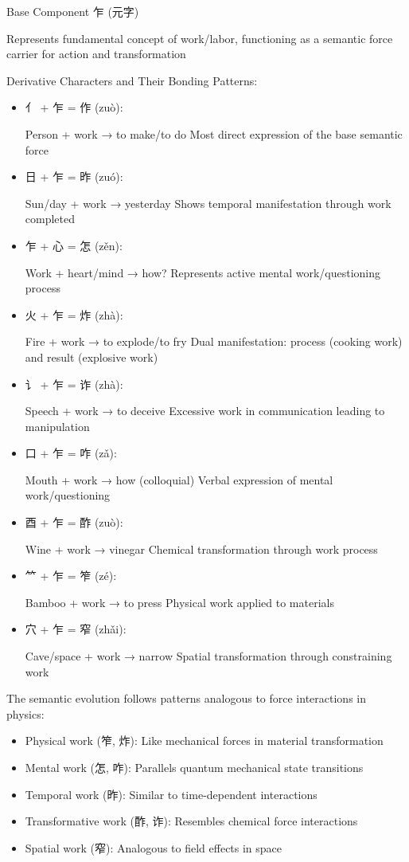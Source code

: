 \documentclass[
]{article}
\begin{document}
Base Component 乍 (元字)

Represents fundamental concept of work/labor, functioning as a semantic
force carrier for action and transformation

Derivative Characters and Their Bonding Patterns:

\begin{itemize}
\item
  亻 + 乍 = 作 (zuò):

  Person + work → to make/to do Most direct expression of the base
  semantic force
\item
  日 + 乍 = 昨 (zuó):

  Sun/day + work → yesterday Shows temporal manifestation through work
  completed
\item
  乍 + 心 = 怎 (zěn):

  Work + heart/mind → how? Represents active mental work/questioning
  process
\item
  火 + 乍 = 炸 (zhà):

  Fire + work → to explode/to fry Dual manifestation: process (cooking
  work) and result (explosive work)
\item
  讠 + 乍 = 诈 (zhà):

  Speech + work → to deceive Excessive work in communication leading to
  manipulation
\item
  口 + 乍 = 咋 (zǎ):

  Mouth + work → how (colloquial) Verbal expression of mental
  work/questioning
\item
  酉 + 乍 = 酢 (zuò):

  Wine + work → vinegar Chemical transformation through work process
\item
  ⺮ + 乍 = 笮 (zé):

  Bamboo + work → to press Physical work applied to materials
\item
  穴 + 乍 = 窄 (zhǎi):

  Cave/space + work → narrow Spatial transformation through constraining
  work
\end{itemize}

The semantic evolution follows patterns analogous to force interactions
in physics:

\begin{itemize}
\item
  Physical work (笮, 炸): Like mechanical forces in material
  transformation
\item
  Mental work (怎, 咋): Parallels quantum mechanical state transitions
\item
  Temporal work (昨): Similar to time-dependent interactions
\item
  Transformative work (酢, 诈): Resembles chemical force interactions
\item
  Spatial work (窄): Analogous to field effects in space
\end{itemize}
\end{document}
